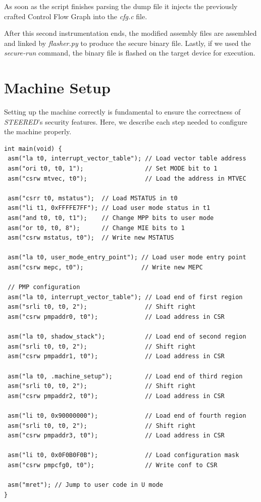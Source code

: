As soon as the script finishes parsing the dump file it injects the previously crafted
Control Flow Graph into the \textit{cfg.c} file.

After this second instrumentation ends, the modified assembly files are assembled
and linked by \textit{flasher.py} to produce the secure binary file. Lastly, if
we used the \textit{secure-run} command, the binary file is flashed on the
target device for execution.

\section{Machine Setup}
\label{sec:project_setup}

Setting up the machine correctly is fundamental to ensure the correctness of \textit{STEERED}'s
security features. Here, we describe each step needed to configure the machine
properly. \\ \begin{lstlisting}[style=CStyle, caption = Machine setup, label={lst:setup}]
int main(void) {
 asm("la t0, interrupt_vector_table"); // Load vector table address
 asm("ori t0, t0, 1");                 // Set MODE bit to 1
 asm("csrw mtvec, t0");                // Load the address in MTVEC

 asm("csrr t0, mstatus");  // Load MSTATUS in t0
 asm("li t1, 0xFFFFE7FF"); // Load user mode status in t1
 asm("and t0, t0, t1");    // Change MPP bits to user mode
 asm("or t0, t0, 8");      // Change MIE bits to 1
 asm("csrw mstatus, t0");  // Write new MSTATUS

 asm("la t0, user_mode_entry_point"); // Load user mode entry point
 asm("csrw mepc, t0");                // Write new MEPC

 // PMP configuration
 asm("la t0, interrupt_vector_table"); // Load end of first region
 asm("srli t0, t0, 2");                // Shift right
 asm("csrw pmpaddr0, t0");             // Load address in CSR

 asm("la t0, shadow_stack");           // Load end of second region
 asm("srli t0, t0, 2");                // Shift right
 asm("csrw pmpaddr1, t0");             // Load address in CSR

 asm("la t0, .machine_setup");         // Load end of third region
 asm("srli t0, t0, 2");                // Shift right
 asm("csrw pmpaddr2, t0");             // Load address in CSR

 asm("li t0, 0x90000000");             // Load end of fourth region
 asm("srli t0, t0, 2");                // Shift right
 asm("csrw pmpaddr3, t0");             // Load address in CSR

 asm("li t0, 0x0F0B0F0B");             // Load configuration mask
 asm("csrw pmpcfg0, t0");              // Write conf to CSR

 asm("mret"); // Jump to user code in U mode
}
\end{lstlisting}


